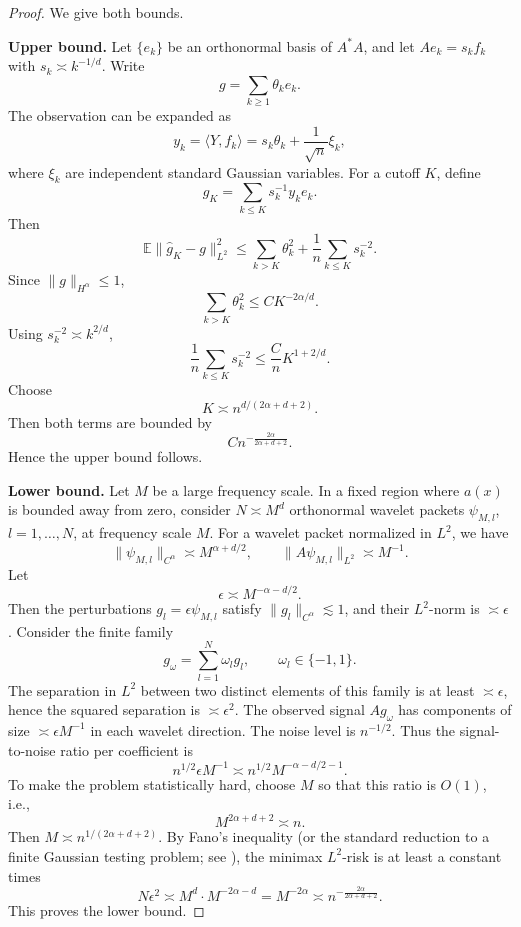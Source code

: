 \documentclass[11pt]{article}
\newcommand{\E}{\mathbb{E}}
\theoremstyle{remark}
\begin{document}
\begin{proof}
We give both bounds.

\medskip
\noindent\textbf{Upper bound.}
Let \(\{e_k\}\) be an orthonormal basis of \(A^*A\), and let \(A e_k=s_k f_k\) with \(s_k\asymp k^{-1/d}\). Write
\[
g=\sum_{k\ge1}\theta_k e_k.
\]
The observation can be expanded as
\[
y_k=\langle Y,f_k\rangle=s_k\theta_k+\frac1{\sqrt n}\xi_k,
\]
where \(\xi_k\) are independent standard Gaussian variables. For a cutoff \(K\), define
\[
\hat g_K=\sum_{k\le K}s_k^{-1}y_k e_k.
\]
Then
\[
\E\|\hat g_K-g\|_{L^2}^2
\le \sum_{k>K}\theta_k^2
+\frac1n\sum_{k\le K}s_k^{-2}.
\]
Since \(\|g\|_{H^\alpha}\le1\),
\[
\sum_{k>K}\theta_k^2\le C K^{-2\alpha/d}.
\]
Using \(s_k^{-2}\asymp k^{2/d}\),
\[
\frac1n\sum_{k\le K}s_k^{-2}
\le \frac{C}{n}K^{1+2/d}.
\]
Choose
\[
K\asymp n^{d/(2\alpha+d+2)}.
\]
Then both terms are bounded by
\[
C n^{-\frac{2\alpha}{2\alpha+d+2}}.
\]
Hence the upper bound follows.

\medskip
\noindent\textbf{Lower bound.}
Let \(M\) be a large frequency scale. In a fixed region where \(a(x)\) is bounded away from zero, consider \(N\asymp M^d\) orthonormal wavelet packets \(\psi_{M,l}\), \(l=1,\dots,N\), at frequency scale \(M\). For a wavelet packet normalized in \(L^2\), we have
\[
\|\psi_{M,l}\|_{C^\alpha}\asymp M^{\alpha+d/2},\qquad
\|A\psi_{M,l}\|_{L^2}\asymp M^{-1}.
\]
Let
\[
\epsilon\asymp M^{-\alpha-d/2}.
\]
Then the perturbations \(g_l=\epsilon\psi_{M,l}\) satisfy \(\|g_l\|_{C^\alpha}\lesssim1\), and their \(L^2\)-norm is \(\asymp\epsilon\). Consider the finite family
\[
g_\omega=\sum_{l=1}^N \omega_l g_l,\qquad \omega_l\in\{-1,1\}.
\]
The separation in \(L^2\) between two distinct elements of this family is at least \(\asymp\epsilon\), hence the squared separation is \(\asymp\epsilon^2\). The observed signal \(A g_\omega\) has components of size \(\asymp \epsilon M^{-1}\) in each wavelet direction. The noise level is \(n^{-1/2}\). Thus the signal-to-noise ratio per coefficient is
\[
n^{1/2}\epsilon M^{-1}
\asymp n^{1/2}M^{-\alpha-d/2-1}.
\]
To make the problem statistically hard, choose \(M\) so that this ratio is \(O(1)\), i.e.,
\[
M^{2\alpha+d+2}\asymp n.
\]
Then \(M\asymp n^{1/(2\alpha+d+2)}\). By Fano's inequality (or the standard reduction to a finite Gaussian testing problem; see \cite[Chapter 2]{tsybakov2009}), the minimax \(L^2\)-risk is at least a constant times
\[
N\epsilon^2\asymp M^d\cdot M^{-2\alpha-d}
=M^{-2\alpha}
\asymp n^{-\frac{2\alpha}{2\alpha+d+2}}.
\]
This proves the lower bound.
\end{proof}
\end{document}
